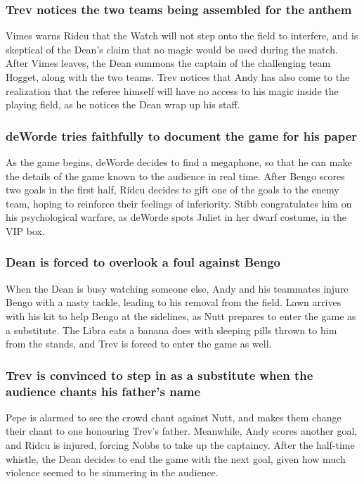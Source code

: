 \subsubsection{\Gls{Trev} notices the two teams being assembled for the anthem}
\Gls{Vimes} warns \Gls{Ridcu} that the Watch will not step onto the field to interfere, and is
skeptical of the \Gls{Dean}'s claim that no magic would be used during the match. After \Gls{Vimes}
leaves, the \Gls{Dean} summons the captain of the challenging team \Gls{Hogget}, along with the
two teams. \Gls{Trev} notices that \Gls{Andy} has also come to the realization that the referee
himself will have no access to his magic inside the playing field, as he notices the \Gls{Dean}
wrap up his staff.

\subsubsection{\Gls{deWorde} tries faithfully to document the game for his paper}
As the game begins, \Gls{deWorde} decides to find a megaphone, so that he can make the details of
the game known to the audience in real time. After \Gls{Bengo} scores two goals in the first half,
\Gls{Ridcu} decides to gift one of the goals to the enemy team, hoping to reinforce their feelings
of inferiority. \Gls{Stibb} congratulates him on his psychological warfare, as \Gls{deWorde} spots
\Gls{Juliet} in her dwarf costume, in the VIP box.

\subsubsection{\Gls{Dean} is forced to overlook a foul against \Gls{Bengo}}
When the \Gls{Dean} is busy watching someone else, \Gls{Andy} and his teammates injure \Gls{Bengo}
with a nasty tackle, leading to his removal from the field. \Gls{Lawn} arrives with his kit to
help \Gls{Bengo} at the sidelines, as \Gls{Nutt} prepares to enter the game as a substitute. The
\Gls{Libra} eats a banana does with sleeping pills thrown to him from the stands, and \Gls{Trev}
is forced to enter the game as well.

\subsubsection{\Gls{Trev} is convinced to step in as a substitute when the audience chants his
    father's name}
\Gls{Pepe} is alarmed to see the crowd chant against \Gls{Nutt}, and makes them change their chant
to one honouring \Gls{Trev}'s father. Meanwhile, \Gls{Andy} scores another goal, and \Gls{Ridcu}
is injured, forcing \Gls{Nobbs} to take up the captaincy. After the half-time whistle, the
\Gls{Dean} decides to end the game with the next goal, given how much violence seemed to be
simmering in the audience.

